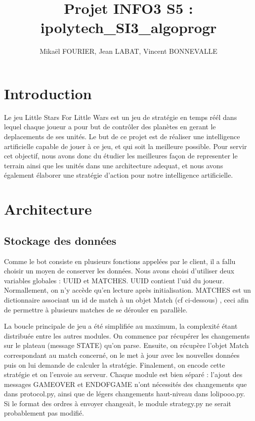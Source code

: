\documentclass{rapport}
\title{Projet INFO3 S5 : ipolytech\_SI3\_algoprogr}
\author{%
	Mikaël FOURIER,
	Jean LABAT,
	Vincent BONNEVALLE
}
\date{}
\begin{document}
	\maketitle
	\tableofcontents
	\chapter*{Introduction}
Le jeu Little Stars For Little Wars est un jeu de stratégie en temps réél dans lequel chaque
joueur a pour but de contrôler des planètes en gerant le deplacements de ses unités.
Le but de ce projet est de réaliser une intelligence artificielle capable de jouer à ce jeu, et qui soit la meilleure possible.
Pour servir cet objectif, nous avons donc du étudier les meilleures façon de representer le terrain ainsi que les unités dans une architecture adequat,
et nous avons également élaborer une stratégie d'action pour notre intelligence artificielle.

	\chapter{Architecture}
		\section{Stockage des données}
Comme le bot consiste en plusieurs fonctions appelées par le client, il a fallu
choisir un moyen de conserver les données. Nous avons choisi d'utiliser deux
variables globales : UUID et MATCHES. UUID contient l'uid du joueur.
Normallement, on n'y accède qu'en lecture après initialisation. MATCHES est un
dictionnaire associant un id de match à un objet Match (cf ci-dessous)
, ceci afin de permettre à plusieurs matches de se dérouler en parallèle.

La boucle principale de jeu a été simplifiée au maximum, la complexité étant
distribuée entre les autres modules. On commence par récupérer les changements
sur le plateau (message STATE) qu'on parse. Ensuite, on récupère l'objet Match
correspondant au match concerné, on le met à jour avec les nouvelles données
puis on lui demande de calculer la stratégie. Finalement, on encode cette
stratégie et on l'envoie au serveur. Chaque module est bien séparé : l'ajout des
messages GAMEOVER et ENDOFGAME n'ont nécessités des changements que dans
protocol.py, ainsi que de légers changements haut-niveau dans lolipooo.py. Si le
format des ordres à envoyer changeait, le module strategy.py ne serait
probablement pas modifié.
\end{document}
